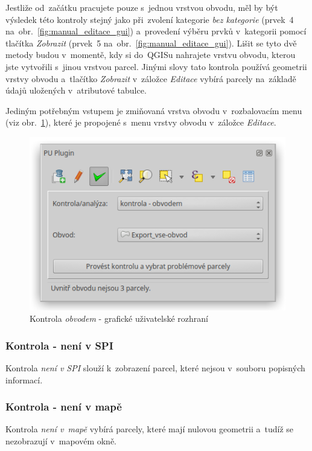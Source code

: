 Jestliže od~začátku pracujete pouze s~jednou vrstvou obvodu, měl by být výsledek této kontroly stejný jako při~zvolení kategorie \textit{bez kategorie} (prvek~4 na~obr.~\ref{fig:manual_editace_gui}) a~provedení výběru prvků v~kategorii pomocí tlačítka \textit{Zobrazit} (prvek~5 na~obr.~\ref{fig:manual_editace_gui}). Lišit se tyto dvě metody budou v~momentě, kdy si do~QGISu nahrajete vrstvu obvodu, kterou jste vytvořili s~jinou vrstvou parcel. Jinými slovy tato kontrola používá geometrii vrstvy obvodu a~tlačítko \textit{Zobrazit} v~záložce \textit{Editace} vybírá parcely na~základě údajů uložených v~atributové tabulce.

Jediným potřebným vstupem je zmiňovaná vrstva obvodu v~rozbalovacím menu (viz obr.~\ref{fig:manual_kontrola_obvodem_gui}), které je propojené s~menu vrstvy obvodu v~záložce \textit{Editace}.

	\begin{figure}[H]
		\centering
		\includegraphics[width=.55\textwidth]{./pictures/kontrola-obvodem.png}
		\caption[Kontrola \textit{obvodem} - grafické uživatelské rozhraní]{Kontrola \textit{obvodem} - grafické uživatelské rozhraní}
		\label{fig:manual_kontrola_obvodem_gui}
 	\end{figure}

\subsubsection{Kontrola - není v SPI}
\label{manual_kontrola_neni_v_spi}

Kontrola \textit{není v SPI} slouží k~zobrazení parcel, které nejsou v~souboru popisných informací.

\subsubsection{Kontrola - není v mapě}
\label{manual_kontrola_neni_v_mape}

Kontrola \textit{není v~mapě} vybírá parcely, které mají nulovou geometrii a~tudíž se nezobrazují v~mapovém okně.

